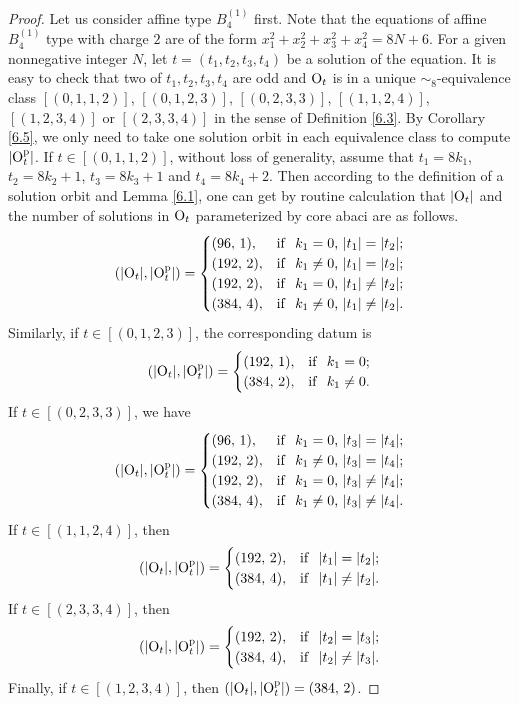 \documentclass[11pt]{amsart}
\theoremstyle{plain}
\numberwithin{equation}{subsection}
\begin{document}
\begin{proof}
Let us consider affine type $B_4^{(1)}$ first. Note that the equations 
of affine $B_4^{(1)}$ type with charge $2$ are of the form $x_1^2+x_2^2+x_3^2+x_4^2=8N+6$.
For a given nonnegative integer $N$, let $t=(t_1, t_2, t_3, t_4)$ be a solution of the equation.
It is easy to check that two of $t_1, t_2, t_3, t_4$ are odd and ${\rm O}_{t}$ is in a unique $\sim_8$-equivalence class
$[(0, 1, 1, 2)]$, $[(0, 1, 2, 3)]$, $[(0, 2, 3, 3)]$, $[(1, 1, 2, 4)]$, $[(1, 2, 3, 4)]$ or $[(2, 3, 3, 4)]$ in the sense of Definition \ref{6.3}.
By Corollary \ref{6.5}, we only need to take one solution orbit in each equivalence class to compute $|{\rm O}_t^{\rm p}|$.
If $t\in [(0, 1, 1, 2)]$, without loss of generality, assume that $t_1=8k_1$, $t_2=8k_2+1$, $t_3=8k_3+1$ and $t_4=8k_4+2$. 
Then according to the definition of a solution orbit and Lemma \ref{6.1}, one can get by routine calculation 
that $|{\rm O}_t|$ and the number of solutions in ${\rm O}_t$ parameterized by core abaci are as follows.
$$(|{\rm O}_t|, |{\rm O}_t^{\rm p}|)=
\begin{cases}
		(96,\,1),  & {\rm if \,\,}  \text{ $k_1=0$, $|t_1|=|t_2|$}; \\
		(192,\,2),  & {\rm if \,\,}  \text{ $k_1\neq 0$, $|t_1|=|t_2|$};\\
		(192,\,2),  & {\rm if \,\,}  \text{ $k_1= 0$, $|t_1|\neq|t_2|$};\\
		(384,\,4),  & {\rm if \,\,}  \text{ $k_1\neq0$, $|t_1|\neq|t_2|$}.
\end{cases}$$
Similarly, if $t\in [(0, 1, 2, 3)]$, the corresponding datum is
$$(|{\rm O}_t|, |{\rm O}_t^{\rm p}|)=
\begin{cases}
	(192,\,1),  &  {\rm if \,\,} \text{ $k_1=0$}; \\
	(384,\,2),  &  {\rm if \,\,} \text{ $k_1\neq 0$.}
\end{cases}$$
If $t\in [(0, 2, 3, 3)]$, we have
$$(|{\rm O}_t|, |{\rm O}_t^{\rm p}|)=
\begin{cases}
		(96,\,1),  & {\rm if \,\,}  \text{ $k_1=0$, $|t_3|=|t_4|$}; \\
		(192,\,2),  & {\rm if \,\,}  \text{ $k_1\neq 0$, $|t_3|=|t_4|$};\\
		(192,\,2),  & {\rm if \,\,}  \text{ $k_1= 0$, $|t_3|\neq|t_4|$};\\
		(384,\,4),  & {\rm if \,\,}  \text{ $k_1\neq0$, $|t_3|\neq|t_4|$}.
\end{cases}$$
If $t\in [(1, 1, 2, 4)]$, then
$$(|{\rm O}_t|, |{\rm O}_t^{\rm p}|)=
\begin{cases}
		(192,\,2),  & {\rm if \,\,}  \text{ $|t_1|=|t_2|$};\\
		(384,\,4),  & {\rm if \,\,}  \text{ $|t_1|\neq|t_2|$}.
\end{cases}$$
If $t\in [(2, 3, 3, 4)]$, then
$$(|{\rm O}_t|, |{\rm O}_t^{\rm p}|)=
\begin{cases}
		(192,\,2),  & {\rm if \,\,}  \text{ $|t_2|=|t_3|$};\\
		(384,\,4),  & {\rm if \,\,}  \text{ $|t_2|\neq|t_3|$}.
\end{cases}$$
Finally, if $t\in [(1, 2, 3, 4)]$, then $(|{\rm O}_t|, |{\rm O}_t^{\rm p}|)=(384, \,2)$.


\end{proof}
\end{document}
